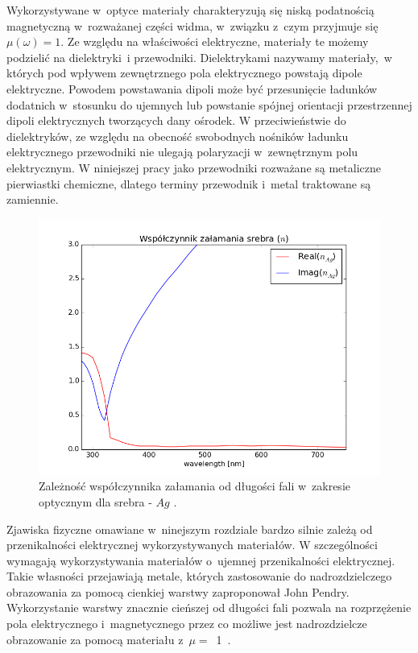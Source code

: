 Wykorzystywane w~optyce materiały charakteryzują się niską podatnością magnetyczną w~rozważanej części widma, w~związku z~czym przyjmuje się ${\mu(\omega)=1}$. Ze względu na właściwości elektryczne, materiały te możemy  podzielić na dielektryki~i przewodniki. Dielektrykami nazywamy materiały,~w których pod wpływem zewnętrznego pola elektrycznego powstają dipole elektryczne. Powodem powstawania dipoli może być przesunięcie ładunków dodatnich w~stosunku do ujemnych lub powstanie spójnej orientacji przestrzennej dipoli elektrycznych tworzących dany ośrodek. W przeciwieństwie do dielektryków, ze względu na obecność swobodnych nośników ładunku elektrycznego przewodniki nie ulegają polaryzacji w~zewnętrznym polu elektrycznym. W niniejszej pracy jako przewodniki rozważane są metaliczne pierwiastki chemiczne, dlatego terminy przewodnik i~metal traktowane są zamiennie.

\begin{figure}[tb]
	\includegraphics[width=\textwidth]{images/agn.png}
	\caption{Zależność współczynnika załamania od długości fali w~zakresie optycznym dla srebra - $Ag$ \cite{PhysRevB.6.4370}.  }
	\label{fig:agn}
\end{figure}
Zjawiska fizyczne omawiane w~ninejszym rozdziale bardzo silnie zależą od przenikalności elektrycznej wykorzystywanych materiałów. W szczególności wymagają wykorzystywania materiałów o~ujemnej przenikalności elektrycznej. Takie własności przejawiają metale, których zastosowanie do nadrozdzielczego obrazowania za pomocą cienkiej warstwy zaproponował John Pendry. Wykorzystanie warstwy znacznie cieńszej od długości fali pozwala na rozprzężenie pola elektrycznego i~magnetycznego przez co możliwe jest nadrozdzielcze obrazowanie za pomocą materiału z~$\mu=$~1~\cite{PhysRevLett.85.3966}.

